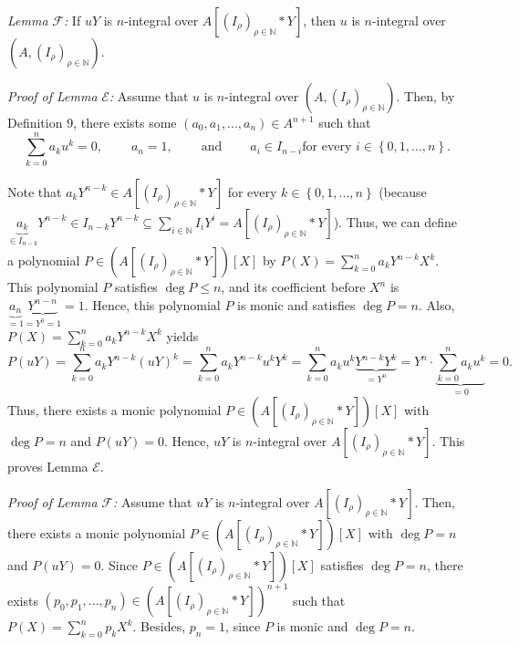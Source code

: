 \documentclass[12pt,final,notitlepage,onecolumn]{article}%
\begin{document}
\textit{Lemma} $\mathcal{F}$\textit{:} If $uY$ is $n$-integral over $A\left[
\left(  I_{\rho}\right)  _{\rho\in\mathbb{N}}\ast Y\right]  $, then $u$ is
$n$-integral over $\left(  A,\left(  I_{\rho}\right)  _{\rho\in\mathbb{N}%
}\right)  $.

\textit{Proof of Lemma }$\mathcal{E}$\textit{:} Assume that $u$ is
$n$-integral over $\left(  A,\left(  I_{\rho}\right)  _{\rho\in\mathbb{N}%
}\right)  $. Then, by Definition 9, there exists some $\left(  a_{0}%
,a_{1},...,a_{n}\right)  \in A^{n+1}$ such that%
\[
\sum\limits_{k=0}^{n}a_{k}u^{k}=0,\ \ \ \ \ \ \ \ \ \ a_{n}%
=1,\ \ \ \ \ \ \ \ \ \ \text{and}\ \ \ \ \ \ \ \ \ \ a_{i}\in I_{n-i}\text{
for every }i\in\left\{  0,1,...,n\right\}  .
\]


Note that $a_{k}Y^{n-k}\in A\left[  \left(  I_{\rho}\right)  _{\rho
\in\mathbb{N}}\ast Y\right]  $ for every $k\in\left\{  0,1,...,n\right\}  $
(because $\underbrace{a_{k}}_{\in I_{n-k}}Y^{n-k}\in I_{n-k}Y^{n-k}%
\subseteq\sum\limits_{i\in\mathbb{N}}I_{i}Y^{i}=A\left[  \left(  I_{\rho
}\right)  _{\rho\in\mathbb{N}}\ast Y\right]  $). Thus, we can define a
polynomial $P\in\left(  A\left[  \left(  I_{\rho}\right)  _{\rho\in\mathbb{N}%
}\ast Y\right]  \right)  \left[  X\right]  $ by $P\left(  X\right)
=\sum\limits_{k=0}^{n}a_{k}Y^{n-k}X^{k}$. This polynomial $P$ satisfies $\deg
P\leq n$, and its coefficient before $X^{n}$ is $\underbrace{a_{n}}%
_{=1}\underbrace{Y^{n-n}}_{=Y^{0}=1}=1$. Hence, this polynomial $P$ is monic
and satisfies $\deg P=n$. Also, $P\left(  X\right)  =\sum\limits_{k=0}%
^{n}a_{k}Y^{n-k}X^{k}$ yields%
\[
P\left(  uY\right)  =\sum\limits_{k=0}^{n}a_{k}Y^{n-k}\left(  uY\right)
^{k}=\sum\limits_{k=0}^{n}a_{k}Y^{n-k}u^{k}Y^{k}=\sum\limits_{k=0}^{n}%
a_{k}u^{k}\underbrace{Y^{n-k}Y^{k}}_{=Y^{n}}=Y^{n}\cdot\underbrace
{\sum\limits_{k=0}^{n}a_{k}u^{k}}_{=0}=0.
\]
Thus, there exists a monic polynomial $P\in\left(  A\left[  \left(  I_{\rho
}\right)  _{\rho\in\mathbb{N}}\ast Y\right]  \right)  \left[  X\right]  $ with
$\deg P=n$ and $P\left(  uY\right)  =0$. Hence, $uY$ is $n$-integral over
$A\left[  \left(  I_{\rho}\right)  _{\rho\in\mathbb{N}}\ast Y\right]  $. This
proves Lemma $\mathcal{E}$.

\textit{Proof of Lemma }$\mathcal{F}$\textit{:} Assume that $uY$ is
$n$-integral over $A\left[  \left(  I_{\rho}\right)  _{\rho\in\mathbb{N}}\ast
Y\right]  $. Then, there exists a monic polynomial $P\in\left(  A\left[
\left(  I_{\rho}\right)  _{\rho\in\mathbb{N}}\ast Y\right]  \right)  \left[
X\right]  $ with $\deg P=n$ and $P\left(  uY\right)  =0$. Since $P\in\left(
A\left[  \left(  I_{\rho}\right)  _{\rho\in\mathbb{N}}\ast Y\right]  \right)
\left[  X\right]  $ satisfies $\deg P=n$, there exists $\left(  p_{0}%
,p_{1},...,p_{n}\right)  \in\left(  A\left[  \left(  I_{\rho}\right)
_{\rho\in\mathbb{N}}\ast Y\right]  \right)  ^{n+1}$ such that $P\left(
X\right)  =\sum\limits_{k=0}^{n}p_{k}X^{k}$. Besides, $p_{n}=1$, since $P$ is
monic and $\deg P=n$.
\end{document}
